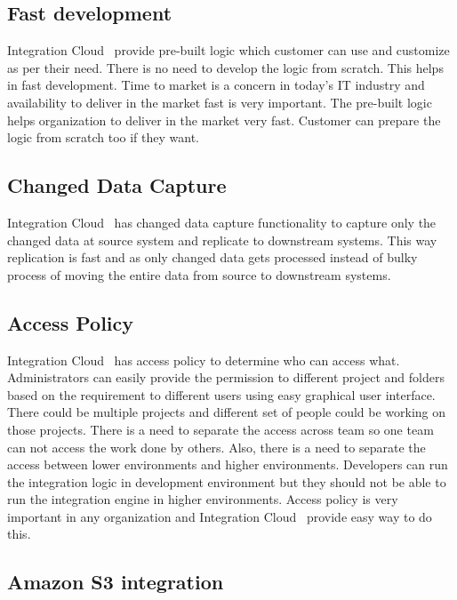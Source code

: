 \subsection{Fast development}
Integration Cloud~\cite{hid-sp18-511-iics} provide pre-built logic which customer can use and customize as per their need. There is no need to develop the logic from scratch. This helps in fast development. Time to market is a concern in today's IT industry and availability to deliver in the market fast is very important. The pre-built logic helps organization to deliver in the market very fast. Customer can prepare the logic from scratch too if they want. 

\subsection{Changed Data Capture}

Integration Cloud~\cite{hid-sp18-511-iics} has changed data capture functionality to capture only the changed data at source system and replicate to downstream systems. This way replication is fast and as only changed data gets processed instead of bulky process of moving the entire data from source to downstream systems.

\subsection{Access Policy}

Integration Cloud~\cite{hid-sp18-511-iics} has access policy to determine who can access what. Administrators can easily provide the permission to different project and folders based on the requirement to different users using easy graphical user interface. There could be multiple projects and different set of people could be working on those projects. There is a need to separate the access across team so one team can not access the work done by others. Also, there is a need to separate the access between lower environments and higher environments. Developers can run the integration logic in development environment but they should not be able to run the integration engine in higher environments. Access policy is very important in any organization and Integration Cloud~\cite{hid-sp18-511-iics} provide easy way to do this.

\subsection{Amazon S3 integration}

